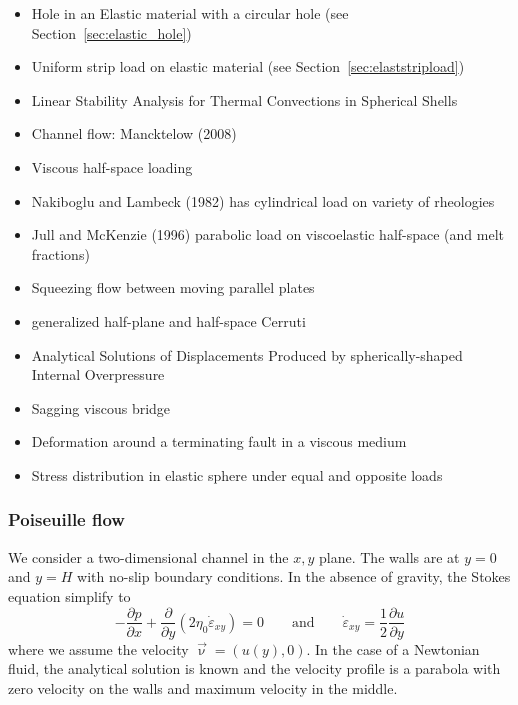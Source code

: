 \begin{itemize}
\item Hole in an Elastic material with a circular hole (see Section~\ref{sec:elastic_hole})
\item Uniform strip load on elastic material (see Section~\ref{sec:elaststripload})
\item Linear Stability Analysis for Thermal Convections in Spherical Shells \cite{yuwa19}
\item Channel flow: Mancktelow (2008) \cite{manc08}
\item Viscous half-space loading \cite{hask35}
\item Nakiboglu and Lambeck (1982) has cylindrical load on variety of rheologies \cite{nala82}
\item Jull and McKenzie (1996) \cite{jumc96} parabolic load on viscoelastic half-space (and melt fractions) 
\item Squeezing flow between moving parallel plates \cite{gugu77}
\item generalized half-plane and half-space Cerruti \cite{nowi92,zhga15}
\item Analytical Solutions of Displacements Produced by spherically-shaped Internal Overpressure \cite{gech12}
\item Sagging viscous bridge \cite{stokes98}
\item Deformation around a terminating fault in a viscous medium \cite{baho96}
\item Stress distribution in elastic sphere under equal and opposite loads \cite{stro52}
\end{itemize}


\subsubsection{Poiseuille flow} \label{ss:poiseuille}

We consider a two-dimensional channel in the $x,y$ plane. The walls 
are at $y=0$ and $y=H$ with no-slip boundary conditions. 
In the absence of gravity, the Stokes equation simplify to 
\begin{equation}
-\frac{\partial p}{\partial x}  +\frac{\partial }{\partial y} (2\eta_0 \dot{\varepsilon}_{xy}) =0
\qquad
\text{and}
\qquad
\dot{\varepsilon}_{xy} = \frac{1}{2} \frac{\partial u}{\partial y} 
\label{eq:pois1}
\end{equation}
where we assume the velocity $\vec\upnu=(u(y),0)$.
In the case of a Newtonian fluid, the analytical solution is 
known and the velocity profile is a parabola with zero velocity on the
walls and maximum velocity in the middle. 


